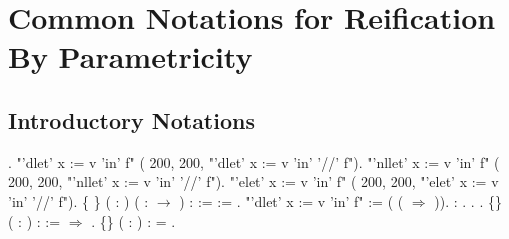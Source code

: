 \begin{coqdoccode}
\end{coqdoccode}
\section{Common Notations for Reification By Parametricity}

\subsection{Introductory Notations}

\begin{coqdoccode}
\coqdocnoindent
{}.\coqdoceol
\coqdocnoindent
{} "'dlet' x := v 'in' f"\coqdoceol
\coqdocindent{4.50em}
(  200,    200,\coqdoceol
\coqdocindent{5.00em}
 "'dlet'  x  :=  v  'in' '//' f").\coqdoceol
\coqdocnoindent
{} "'nllet' x := v 'in' f"\coqdoceol
\coqdocindent{4.50em}
(  200,    200,\coqdoceol
\coqdocindent{5.00em}
 "'nllet'  x  :=  v  'in' '//' f").\coqdoceol
\coqdocnoindent
{} "'elet' x := v 'in' f"\coqdoceol
\coqdocindent{4.50em}
(  200,    200,\coqdoceol
\coqdocindent{5.00em}
 "'elet'  x  :=  v  'in' '//' f").\coqdoceol
\coqdocnoindent
{}  \{ \} ( : ) ( :  \ensuremath{\rightarrow} ) : \coqdoceol
\coqdocindent{1.00em}
:=   :=    .\coqdoceol
\coqdocnoindent
{} "'dlet' x := v 'in' f" := (  (  \ensuremath{\Rightarrow} )).\coqdoceol
\coqdocnoindent
{}  : .  . .\coqdoceol
\coqdocnoindent
{}  \{\} ( : ) :  :=     \ensuremath{\Rightarrow}  .\coqdoceol
\coqdocnoindent
{}  \{\} ( : ) :   = .\coqdoceol

\end{coqdoccode}
